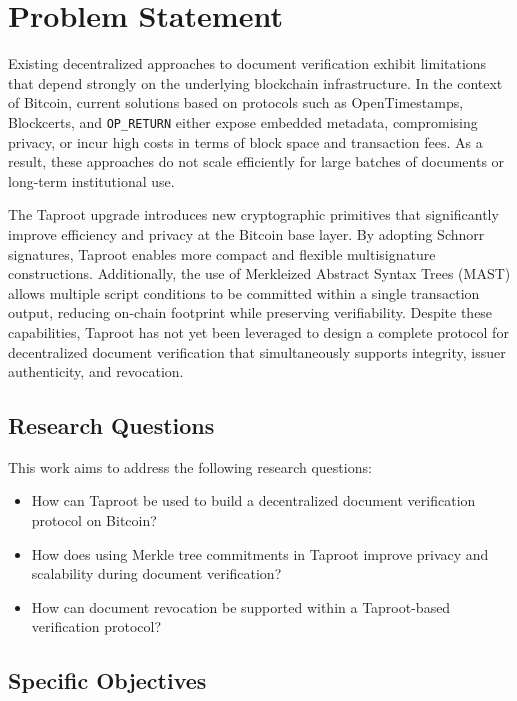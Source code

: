 \section{Problem Statement}

Existing decentralized approaches to document verification exhibit limitations that depend strongly on the underlying blockchain infrastructure.
In the context of Bitcoin, current solutions based on protocols such as OpenTimestamps, Blockcerts, and \texttt{OP\_RETURN} either expose embedded metadata, compromising privacy, or incur high costs in terms of block space and transaction fees.
As a result, these approaches do not scale efficiently for large batches of documents or long-term institutional use.

The Taproot upgrade introduces new cryptographic primitives that significantly improve efficiency and privacy at the Bitcoin base layer.
By adopting Schnorr signatures, Taproot enables more compact and flexible multisignature constructions.
Additionally, the use of Merkleized Abstract Syntax Trees (MAST) allows multiple script conditions to be committed within a single transaction output, reducing on-chain footprint while preserving verifiability.
Despite these capabilities, Taproot has not yet been leveraged to design a complete protocol for decentralized document verification that simultaneously supports integrity, issuer authenticity, and revocation.

\subsection{Research Questions}

This work aims to address the following research questions:
\begin{itemize}
    \item How can Taproot be used to build a decentralized document verification protocol on Bitcoin?
    \item How does using Merkle tree commitments in Taproot improve privacy and scalability during document verification?
    \item How can document revocation be supported within a Taproot-based verification protocol?
\end{itemize}

\subsection{Specific Objectives}

